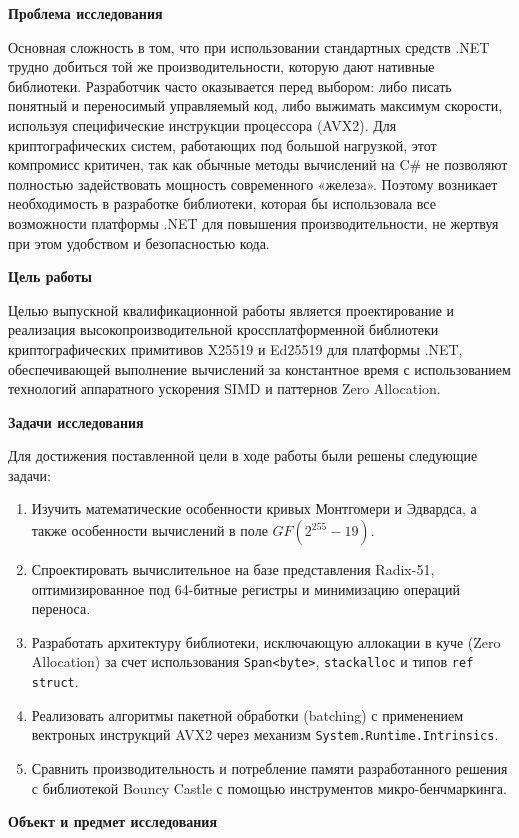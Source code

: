 \textbf{Проблема исследования}

Основная сложность в том, что при использовании стандартных средств .NET трудно добиться той же производительности, которую дают нативные библиотеки. Разработчик часто оказывается перед выбором: либо писать понятный и переносимый управляемый код, либо выжимать максимум скорости, используя специфические инструкции процессора (AVX2). Для криптографических систем, работающих под большой нагрузкой, этот компромисс критичен, так как обычные методы вычислений на C# не позволяют полностью задействовать мощность современного «железа». Поэтому возникает необходимость в разработке библиотеки, которая бы использовала все возможности платформы .NET для повышения производительности, не жертвуя при этом удобством и безопасностью кода.


\textbf{Цель работы}

Целью выпускной квалификационной работы является проектирование и реализация высокопроизводительной кроссплатформенной библиотеки криптографических примитивов X25519 и Ed25519 для платформы .NET, обеспечивающей выполнение вычислений за константное время с использованием технологий аппаратного ускорения SIMD и паттернов Zero Allocation.


\textbf{Задачи исследования}

Для достижения поставленной цели в ходе работы были решены следующие задачи:

\begin{enumerate}
    \item Изучить математические особенности кривых Монтгомери и Эдвардса, а также особенности вычислений в поле $GF(2^{255}-19)$.
    \item Спроектировать вычислительное на базе представления Radix-51, оптимизированное под 64-битные регистры и минимизацию операций переноса.
    \item Разработать архитектуру библиотеки, исключающую аллокации в куче (Zero Allocation) за счет использования \texttt{Span<byte>}, \texttt{stackalloc} и типов \texttt{ref struct}.
    \item Реализовать алгоритмы пакетной обработки (batching) с применением вектроных инструкций AVX2 через механизм \texttt{System.Runtime.Intrinsics}.
    \item Сравнить производительность и потребление памяти разработанного решения с библиотекой Bouncy Castle с помощью инструментов микро-бенчмаркинга.
\end{enumerate}

\textbf{Объект и предмет исследования}

